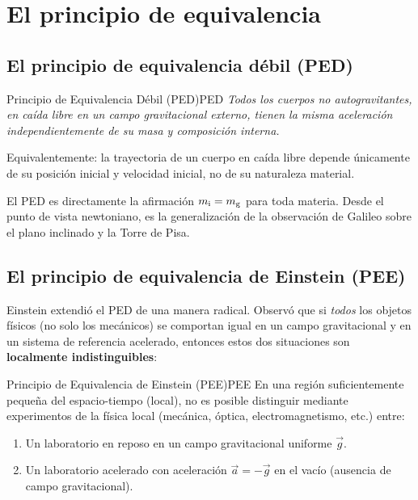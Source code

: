 \section{El principio de equivalencia}
\label{sec:principio_equivalencia}

\subsection{El principio de equivalencia débil (PED)}

\begin{definicion}{Principio de Equivalencia Débil (PED)}{PED}
\emph{Todos los cuerpos no autogravitantes, en caída libre en un campo gravitacional externo, tienen la misma aceleración independientemente de su masa y composición interna.}

Equivalentemente: la trayectoria de un cuerpo en caída libre depende únicamente de su posición inicial y velocidad inicial, no de su naturaleza material.
\end{definicion}

El PED es directamente la afirmación $m_{\rm i} = m_{\rm g}$ para toda materia. Desde el punto de vista newtoniano, es la generalización de la observación de Galileo sobre el plano inclinado y la Torre de Pisa.

\subsection{El principio de equivalencia de Einstein (PEE)}

Einstein extendió el PED de una manera radical. Observó que si \emph{todos} los objetos físicos (no solo los mecánicos) se comportan igual en un campo gravitacional y en un sistema de referencia acelerado, entonces estos dos situaciones son \textbf{localmente indistinguibles}:

\begin{definicion}{Principio de Equivalencia de Einstein (PEE)}{PEE}
En una región suficientemente pequeña del espacio-tiempo (local), no es posible distinguir mediante experimentos de la física local (mecánica, óptica, electromagnetismo, etc.) entre:
\begin{enumerate}[leftmargin=2em]
  \item Un laboratorio en reposo en un campo gravitacional uniforme $\vec{g}$.
  \item Un laboratorio acelerado con aceleración $\vec{a} = -\vec{g}$ en el vacío (ausencia de campo gravitacional).
\end{enumerate}
\end{definicion}

